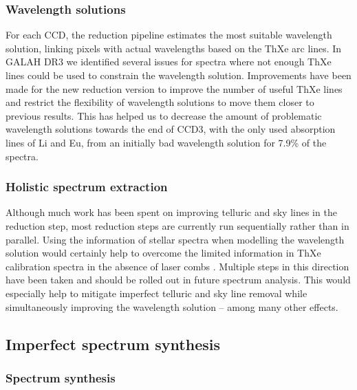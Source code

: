 \documentclass[
  journal=pasa,
  manuscript=research-paper, %
  year=2024,
  volume=37
]{cup-journal}
\begin{document}
\subsubsection{Wavelength solutions}

For each CCD, the reduction pipeline estimates the most suitable wavelength solution, linking pixels with actual wavelengths based on the ThXe arc lines. In GALAH DR3 \citep{Buder2021} we identified several issues for spectra where not enough ThXe lines could be used to constrain the wavelength solution. Improvements have been made for the new reduction version to improve the number of useful ThXe lines and restrict the flexibility of wavelength solutions to move them closer to previous results. This has helped us to decrease the amount of problematic wavelength solutions towards the end of CCD3, with the only used absorption lines of Li and Eu, from an initially bad wavelength solution for 7.9\% of the spectra.

\subsubsection{Holistic spectrum extraction}

Although much work has been spent on improving telluric and sky lines in the reduction step, most reduction steps are currently run sequentially rather than in parallel. Using the information of stellar spectra when modelling the wavelength solution would certainly help to overcome the limited information in ThXe calibration spectra in the absence of laser combs \citep{Kos2018b}. Multiple steps in this direction have been taken \citep{Saydjari2023} and should be rolled out in future spectrum analysis. This would especially help to mitigate imperfect telluric and sky line removal while simultaneously improving the wavelength solution -- among many other effects.

\subsection{Imperfect spectrum synthesis} \label{sec:caveats_synthesis}

\subsubsection{Spectrum synthesis}
\end{document}
